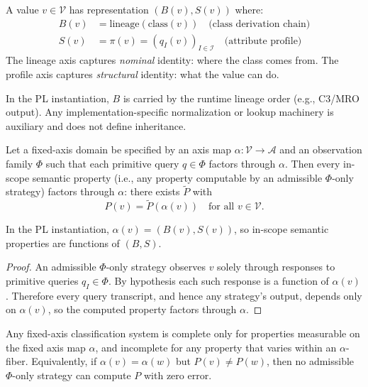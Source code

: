 \begin{definition}
A value $v \in \mathcal{V}$ has representation $(B(v), S(v))$ where:
\begin{align}
B(v) &= \text{lineage}(\text{class}(v)) \quad \text{(class derivation chain)} \\
S(v) &= \pi(v) = (q_I(v))_{I \in \mathcal{I}} \quad \text{(attribute profile)}
\end{align}
The lineage axis captures \emph{nominal} identity: where the class comes from. The profile axis captures \emph{structural} identity: what the value can do.

In the PL instantiation, $B$ is carried by the runtime lineage order (e.g., C3/MRO output). Any implementation-specific normalization or lookup machinery is auxiliary and does not define inheritance.
\end{definition}

\begin{theorem}\label{thm:model-completeness}
Let a fixed-axis domain be specified by an axis map $\alpha: \mathcal{V} \to \mathcal{A}$ and an observation family $\Phi$ such that each primitive query $q \in \Phi$ factors through $\alpha$. Then every in-scope semantic property (i.e., any property computable by an admissible $\Phi$-only strategy) factors through $\alpha$: there exists $\tilde{P}$ with
\[
P(v) = \tilde{P}(\alpha(v)) \quad \text{for all } v \in \mathcal{V}.
\]
\end{theorem}

In the PL instantiation, $\alpha(v) = (B(v), S(v))$, so in-scope semantic properties are functions of $(B,S)$.

\begin{proof}
An admissible $\Phi$-only strategy observes $v$ solely through responses to primitive queries $q_I \in \Phi$. By hypothesis each such response is a function of $\alpha(v)$. Therefore every query transcript, and hence any strategy's output, depends only on $\alpha(v)$, so the computed property factors through $\alpha$.
\end{proof}

\begin{corollary}\label{cor:fixed-axis-incompleteness}
Any fixed-axis classification system is complete only for properties measurable on the fixed axis map $\alpha$, and incomplete for any property that varies within an $\alpha$-fiber. Equivalently, if $\alpha(v)=\alpha(w)$ but $P(v)\neq P(w)$, then no admissible $\Phi$-only strategy can compute $P$ with zero error.
\end{corollary}

